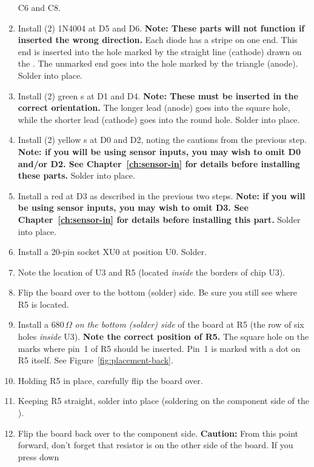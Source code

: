\documentclass[letterpaper,twoside,onecolumn,openright,final]{memoir}
\begin{document}
\begin{enumerate}
	C6 and C8.
\item	Install (2) 1N4004  at D5 and D6.  
	{\bfseries Note: These parts will not function
	if inserted the wrong direction.} Each diode has
	a stripe on one end. This end is inserted into the hole marked by the straight line (cathode)
	drawn on the .  The unmarked end goes into the hole marked by the triangle
	(anode).  Solder into place. 
\item	Install (2) green s at D1 and D4.  
	{\bfseries Note: These must be inserted in the 
	correct orientation.} The longer lead (anode) goes into the 
	square hole, while the shorter
	lead (cathode) goes into the round hole.  Solder into place.
\item	Install (2) yellow s at D0 and D2, noting the 
	cautions from the previous step.
	{\bfseries Note: if you will be using sensor inputs, you may
	wish to omit D0 and/or D2.  See Chapter~\ref{ch:sensor-in} for 
	details before installing these parts.}
	Solder into place.
\item	Install a red  at D3 as described in the previous
	two steps.  
	{\bfseries Note: if you will be using sensor inputs, you may
	wish to omit D3.  See Chapter~\ref{ch:sensor-in} for 
	details before installing this part.}
	Solder into place.
\item	Install a 20-pin  socket XU0 at position U0. Solder.
\item	Note the location of U3 and R5 (located \emph{inside} the borders 
	of chip U3).
\item	Flip the board over to the bottom (solder) side.  Be sure you still see where R5 is
	located.
\item
	Install a 680\,$\Omega$  
	\emph{on the bottom (solder) side} of the board at
	R5 (the row of six holes \emph{inside} U3).  {\bfseries Note the correct position of R5.} The
	square hole on the  marks where pin~1 of R5 should be inserted.  Pin~1 is marked
	with a dot on R5 itself. See Figure~\ref{fig:placement-back}.
\item	Holding R5 in place, carefully flip the board over.
\item
	Keeping R5 straight, solder into place (soldering on the component side of the ).
\item	Flip the board back over to the component side.  {\bfseries Caution:} From this point 
	forward, don't forget that resistor is on the other side of the board.  If you press down

\end{enumerate}
\end{document}
